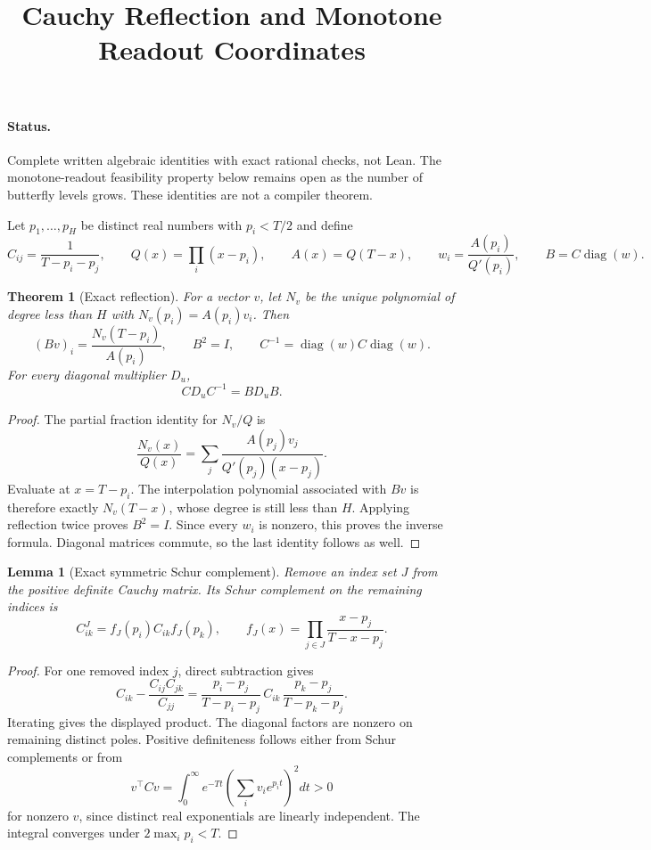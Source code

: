 \documentclass[11pt]{article}
\title{Cauchy Reflection and Monotone Readout Coordinates}
\author{}\date{}
\newtheorem{theorem}{Theorem}
\newtheorem{lemma}{Lemma}
\begin{document}
\maketitle
\paragraph{Status.}
Complete written algebraic identities with exact rational checks, not Lean.
The monotone-readout feasibility property below remains open as the number
of butterfly levels grows. These identities are not a compiler theorem.

Let $p_1,\ldots,p_H$ be distinct real numbers with $p_i<T/2$ and define
\[
 C_{ij}=\frac1{T-p_i-p_j},\qquad
 Q(x)=\prod_i(x-p_i),\qquad A(x)=Q(T-x),\qquad
 w_i=\frac{A(p_i)}{Q'(p_i)},\qquad B=C\operatorname{diag}(w).
\]
\begin{theorem}[Exact reflection]
For a vector $v$, let $N_v$ be the unique polynomial of degree less than
$H$ with $N_v(p_i)=A(p_i)v_i$. Then
\[
 (Bv)_i=\frac{N_v(T-p_i)}{A(p_i)},\qquad B^2=I,
 \qquad C^{-1}=\operatorname{diag}(w)C\operatorname{diag}(w).
\]
For every diagonal multiplier $D_u$,
\[
 C D_u C^{-1}=B D_u B.
\]
\end{theorem}
\begin{proof}
The partial fraction identity for $N_v/Q$ is
\[
 \frac{N_v(x)}{Q(x)}
 =\sum_j\frac{A(p_j)v_j}{Q'(p_j)(x-p_j)}.
\]
Evaluate at $x=T-p_i$. The interpolation polynomial associated with
$Bv$ is therefore exactly $N_v(T-x)$, whose degree is still less than
$H$. Applying reflection twice proves $B^2=I$. Since every $w_i$ is
nonzero, this proves the inverse formula. Diagonal matrices commute,
so the last identity follows as well.
\end{proof}

\begin{lemma}[Exact symmetric Schur complement]
Remove an index set $J$ from the positive definite Cauchy matrix. Its
Schur complement on the remaining indices is
\[
 C^J_{ik}=f_J(p_i)C_{ik}f_J(p_k),\qquad
 f_J(x)=\prod_{j\in J}\frac{x-p_j}{T-x-p_j}.
\]
\end{lemma}
\begin{proof}
For one removed index $j$, direct subtraction gives
\[
 C_{ik}-\frac{C_{ij}C_{jk}}{C_{jj}}
 =\frac{p_i-p_j}{T-p_i-p_j}\,C_{ik}\,
   \frac{p_k-p_j}{T-p_k-p_j}.
\]
Iterating gives the displayed product. The diagonal factors are nonzero
on remaining distinct poles. Positive definiteness follows either from
Schur complements or from
\[
 v^\top C v=\int_0^\infty e^{-Tt}
       \left(\sum_i v_i e^{p_it}\right)^2dt>0
\]
for nonzero $v$, since distinct real exponentials are linearly independent.
The integral converges under $2\max_i p_i<T$.
\end{proof}
\end{document}
